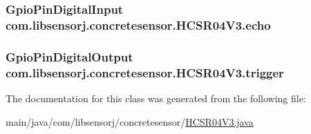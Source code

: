 \subsubsection[{echo}]{\setlength{\rightskip}{0pt plus 5cm}Gpio\+Pin\+Digital\+Input com.\+libsensorj.\+concretesensor.\+H\+C\+S\+R04\+V3.\+echo\hspace{0.3cm}{\ttfamily [package]}}\label{classcom_1_1libsensorj_1_1concretesensor_1_1HCSR04V3_af9a0b50a27f87a546ac58b58bb31d904}
\hypertarget{classcom_1_1libsensorj_1_1concretesensor_1_1HCSR04V3_a19762eb3b140e33fde8b7e2d936a43dc}{}
\subsubsection[{trigger}]{\setlength{\rightskip}{0pt plus 5cm}Gpio\+Pin\+Digital\+Output com.\+libsensorj.\+concretesensor.\+H\+C\+S\+R04\+V3.\+trigger\hspace{0.3cm}{\ttfamily [package]}}\label{classcom_1_1libsensorj_1_1concretesensor_1_1HCSR04V3_a19762eb3b140e33fde8b7e2d936a43dc}


The documentation for this class was generated from the following file\+:\begin{DoxyCompactItemize}
\item 
main/java/com/libsensorj/concretesensor/\hyperlink{HCSR04V3_8java}{H\+C\+S\+R04\+V3.\+java}\end{DoxyCompactItemize}
